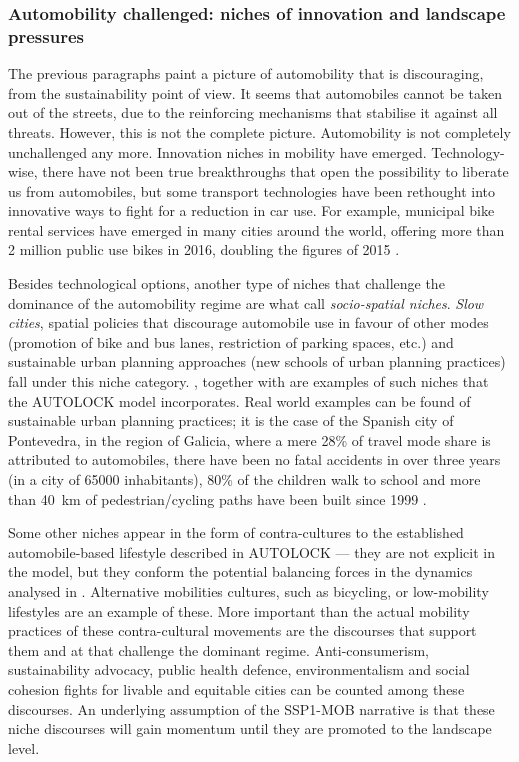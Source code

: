\subsubsection*{Automobility challenged: niches of innovation and landscape pressures}
The previous paragraphs paint a picture of automobility that is discouraging, from the sustainability point of view. It seems that automobiles cannot be taken out of the streets, due to the reinforcing mechanisms that stabilise it against all threats. However, this is not the complete picture. Automobility is not completely unchallenged any more. Innovation niches in mobility have emerged. Technology-wise, there have not been true breakthroughs that open the possibility to liberate us from automobiles, but some transport technologies have been rethought into innovative ways to fight for a reduction in car use. For example, municipal bike rental services have emerged in many cities around the world, offering more than 2 million public use bikes in 2016, doubling the figures of 2015 \parencite{meddin2017_BikesharingWorld}.

Besides technological options, another type of niches that challenge the dominance of the automobility regime are what \textcite{zijlstra2012_SocioSpatialPerspective} call \emph{socio-spatial niches}. \emph{Slow cities}, spatial policies that discourage automobile use in favour of other modes (promotion of bike and bus lanes, restriction of parking spaces, etc.) and sustainable urban planning approaches (new schools of urban planning practices) fall under this niche category. , together with  are examples of such niches that the AUTOLOCK model incorporates. Real world examples can be found of sustainable urban planning practices; it is the case of the Spanish city of Pontevedra, in the region of Galicia, where a mere 28\% of travel mode share is attributed to automobiles, there have been no fatal accidents in over three years (in a city of \num{65000} inhabitants), 80\% of the children walk to school and more than \SI{40}{\kilo\meter} of pedestrian/cycling paths have been built since 1999 \parencite{precedo2017_Pontevedraelsueno}.

Some other niches appear in the form of contra-cultures to the established automobile-based lifestyle described in AUTOLOCK --- they are not explicit in the model, but they conform the potential balancing forces in the dynamics analysed in . Alternative mobilities cultures, such as bicycling, or low-mobility lifestyles are an example of these. More important than the actual mobility practices of these contra-cultural movements are the discourses that support them and at that challenge the dominant regime. Anti-consumerism, sustainability advocacy, public health defence, environmentalism and social cohesion fights for livable and equitable cities can be counted among these discourses. An underlying assumption of the SSP1-MOB narrative is that these niche discourses will gain momentum until they are promoted to the landscape level.

